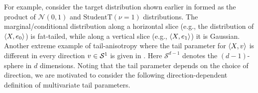 \documentclass[thesis.tex]{subfiles}
\begin{document}

For example, consider the target distribution shown earlier in  formed as the product of $\mathcal{N}(0,1)$ and $\text{StudentT}(\nu=1)$ distributions.
The marginal/conditional distribution along a horizontal slice (e.g., the distribution of $\braket{X,e_0}$)
is fat-tailed, while along a vertical slice (e.g., $\braket{X,e_1}$) it is Gaussian.
Another extreme example of tail-anisotropy where the tail parameter for
$\braket{X,v}$ is different in every direction $v \in {\mathcal{S}}^{1}$
is given in . Here $\mathcal{S}^{d-1}$ denotes the $(d-1)$-sphere in $d$ dimensions. 
Noting that the tail parameter depends on the choice of direction, we are motivated to consider
the following direction-dependent definition of multivariate tail parameters. 

\end{document}
